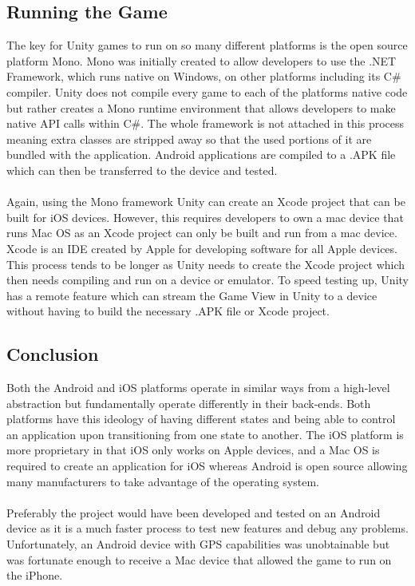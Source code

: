 \documentclass[a4paper]{report}
\begin{document}
\subsection{Running the Game}
The key for Unity games to run on so many different platforms is the open source platform Mono. Mono was initially created to allow developers to use the .NET Framework, which runs native on Windows, on other platforms including its C\# compiler. Unity does not compile every game to each of the platforms native code but rather creates a Mono runtime environment that allows developers to make native API calls within C\#. The whole framework is not attached in this process meaning extra classes are stripped away so that the used portions of it are bundled with the application. Android applications are compiled to a .APK file which can then be transferred to the device and tested. \cite{UnityPlatforms}
\\\\
Again, using the Mono framework Unity can create an Xcode project that can be built for iOS devices. However, this requires developers to own a mac device that runs Mac OS as an Xcode project can only be built and run from a mac device. Xcode is an IDE created by Apple for developing software for all Apple devices. This process tends to be longer as Unity needs to create the Xcode project which then needs compiling and run on a device or emulator. To speed testing up, Unity has a remote feature which can stream the Game View in Unity to a device without having to build the necessary .APK file or Xcode project.

\subsection{Conclusion}
Both the Android and iOS platforms operate in similar ways from a high-level abstraction but fundamentally operate differently in their back-ends. Both platforms have this ideology of having different states and being able to control an application upon transitioning from one state to another. The iOS platform is more proprietary in that iOS only works on Apple devices, and a Mac OS is required to create an application for iOS whereas Android is open source allowing many manufacturers to take advantage of the operating system.
\\\\
Preferably the project would have been developed and tested on an Android device as it is a much faster process to test new features and debug any problems. Unfortunately, an Android device with GPS capabilities was unobtainable but was fortunate enough to receive a Mac device that allowed the game to run on the iPhone.
\end{document}
